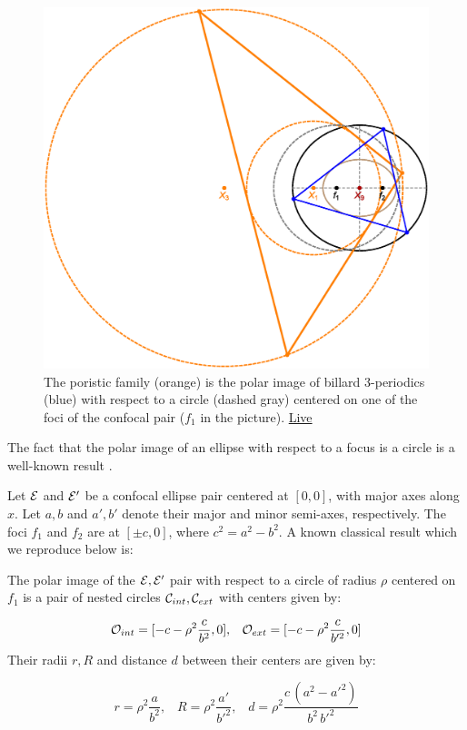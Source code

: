 \begin{figure}
    \centering
    \includegraphics[width=.8\textwidth]{chap_03/pics/pics_03_200_polar_poristic.eps}
    \caption{The poristic family (orange) is the polar image of billard 3-periodics (blue) with respect to a circle (dashed gray) centered on one of the foci of the confocal pair ($f_1$ in the picture). \href{https://bit.ly/3nQ2wcH}{Live}}
    \label{fig:03-polar-poristic}
\end{figure}

The fact that the polar image of an ellipse with respect to a focus is a circle is a well-known result \cite{akopyan2007-conics}.

Let $\mathcal{E}$ and $\mathcal{E}'$ be a confocal ellipse pair centered at $[0,0]$, with major axes along $x$. Let $a,b$ and $a',b'$ denote their major and minor semi-axes, respectively. The foci $f_1$ and $f_2$ are at $[\pm c,0]$, where $c^2=a^2-b^2$. A known classical result which we reproduce below is:

\begin{lemma}
The polar image of the $\mathcal{E},\mathcal{E}'$ pair with respect to a circle of radius $\rho$ centered on $f_1$ is a pair of nested circles $\mathcal{C}_{int},\mathcal{C}_{ext}$ with centers given by:

\[\mathcal{O}_{int}=[-c-\rho^2\frac{c}{b^2},0],\;\;\;\mathcal{O}_{ext}=[-c-\rho^2\frac{c}{b'^2},0]\]
Their radii $r,R$ and distance $d$ between their centers are given by: 

\[ r=\rho^2\frac{a}{b^2},\;\;\;R=\rho^2\frac{a'}{b'^2},\;\;\; d=\rho^2\frac{ c\, (a^2 - {a'}^2)}{b^2\, {b'}^2} \]
\end{lemma}

